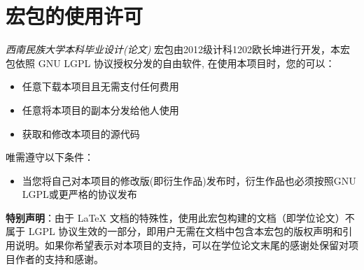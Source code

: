 \appendix

  \chapter{宏包的使用许可}
  \label{appendix:a}

  \emph{西南民族大学本科毕业设计(论文)} 宏包由2012级计科1202欧长坤进行开发，本宏包依照 GNU LGPL 协议授权分发的自由软件, 在使用本项目时，您的可以：

\begin{itemize}
    \item 任意下载本项目且无需支付任何费用
    \item 任意将本项目的副本分发给他人使用
    \item 获取和修改本项目的源代码
\end{itemize}

  唯需遵守以下条件：

  \begin{itemize}
      \item 当您将自己对本项目的修改版(即衍生作品)发布时，衍生作品也必须按照GNU LGPL或更严格的协议发布
  \end{itemize}

  \textbf{特别声明}：由于 LaTeX 文档的特殊性，使用此宏包构建的文档（即学位论文）不属于 LGPL 协议生效的一部分，即用户无需在文档中包含本宏包的版权声明和引用说明。如果你希望表示对本项目的支持，可以在学位论文末尾的感谢处保留对项目作者的支持和感谢。

  \cleardoublepage

